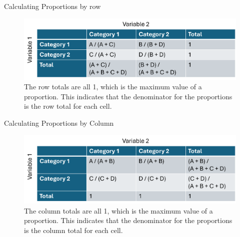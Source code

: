 \documentclass[
  ignorenonframetext,
]{beamer}
\begin{document}
\begin{frame}{Calculating Proportions by row}
\label{calculating-proportions-by-row}
\begin{figure}[H]

{\centering \includegraphics{class07/contingency-table-row-proportions.png}

}

\caption{The row totals are all 1, which is the maximum value of a
proportion. This indicates that the denominator for the proportions is
the row total for each cell.}

\end{figure}%
\end{frame}

\begin{frame}{Calculating Proportions by Column}
\label{calculating-proportions-by-column}
\begin{figure}[H]

{\centering \includegraphics{class07/contingency-table-col-proportions.png}

}

\caption{The column totals are all 1, which is the maximum value of a
proportion. This indicates that the denominator for the proportions is
the column total for each cell.}

\end{figure}%
\end{frame}
\end{document}
